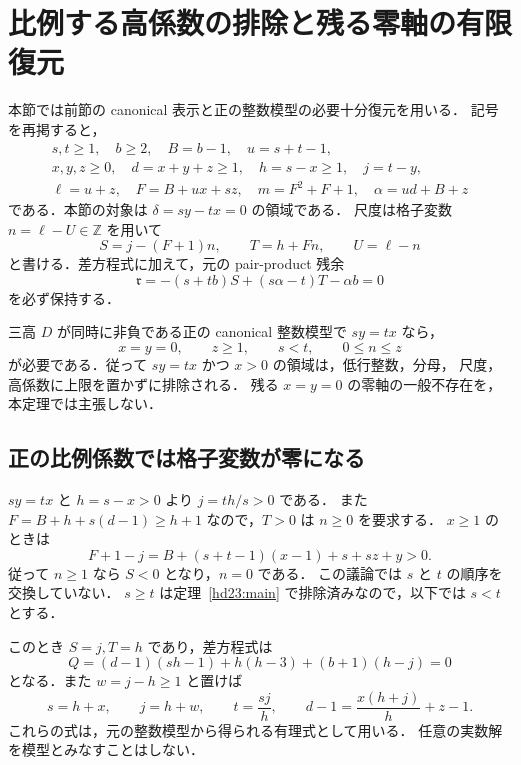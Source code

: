\section{比例する高係数の排除と残る零軸の有限復元}
\label{hp24:section}

本節では前節の canonical 表示と正の整数模型の必要十分復元を用いる．
記号を再掲すると，
\[
\begin{gathered}
s,t\ge1,\quad b\ge2,\quad B=b-1,\quad u=s+t-1,\\
x,y,z\ge0,\quad d=x+y+z\ge1,\quad h=s-x\ge1,\quad j=t-y,\\
\ell=u+z,\quad F=B+ux+sz,\quad m=F^2+F+1,\quad
\alpha=ud+B+z
\end{gathered}
\]
である．本節の対象は $\delta=sy-tx=0$ の領域である．
尺度は格子変数 $n=\ell-U\in\mathbb Z$ を用いて
\begin{equation}\label{hp24:lattice}
 S=j-(F+1)n,\qquad T=h+Fn,\qquad U=\ell-n
\end{equation}
と書ける．差方程式に加えて，元の pair-product 残余
\begin{equation}\label{hp24:residual}
 \mathfrak r=-(s+tb)S+(s\alpha-t)T-\alpha b=0
\end{equation}
を必ず保持する．

\begin{theorem}[比例領域の零軸への帰着]
\label{hp24:main}
三高 $D$ が同時に非負である正の canonical 整数模型で $sy=tx$ なら，
\[
 x=y=0,\qquad z\ge1,\qquad s<t,\qquad 0\le n\le z
\]
が必要である．従って $sy=tx$ かつ $x>0$ の領域は，低行整数，分母，
尺度，高係数に上限を置かずに排除される．
残る $x=y=0$ の零軸の一般不存在を，本定理では主張しない．
\end{theorem}

\subsection{正の比例係数では格子変数が零になる}

$sy=tx$ と $h=s-x>0$ より $j=th/s>0$ である．
また $F=B+h+s(d-1)\ge h+1$ なので，$T>0$ は $n\ge0$ を要求する．
$x\ge1$ のときは
\[
 F+1-j=B+(s+t-1)(x-1)+s+sz+y>0.
\]
従って $n\ge1$ なら $S<0$ となり，$n=0$ である．
この議論では $s$ と $t$ の順序を交換していない．
$s\ge t$ は定理~\ref{hd23:main} で排除済みなので，以下では $s<t$ とする．

このとき $S=j,T=h$ であり，差方程式は
\begin{equation}\label{hp24:Q}
 Q=(d-1)(sh-1)+h(h-3)+(b+1)(h-j)=0
\end{equation}
となる．また $w=j-h\ge1$ と置けば
\[
 s=h+x,\qquad j=h+w,\qquad t=\frac{sj}{h},\qquad
 d-1=\frac{x(h+j)}h+z-1.
\]
これらの式は，元の整数模型から得られる有理式として用いる．
任意の実数解を模型とみなすことはしない．

